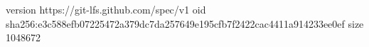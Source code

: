 version https://git-lfs.github.com/spec/v1
oid sha256:e3c588efb07225472a379dc7da257649e195cfb7f2422cac4411a914233ee0ef
size 1048672
